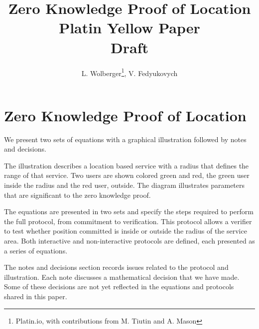 \documentclass{article}
\begin{document}
\pagecolor{yellow}


\title{
	Zero Knowledge Proof of Location\\
	\small{
	Platin Yellow Paper\\
	Draft}
}
\author{L. Wolberger\thanks{Platin.io, with contributions from M. Tiutin and A. Mason}, V. Fedyukovych\footnotemark[1]}
\maketitle

\section{Zero Knowledge Proof of Location}

We present two sets of equations with a graphical illustration followed by notes and decisions. 

The illustration describes a location based service with a radius that defines the range of that service.
Two users are shown colored green and red, the green user inside the radius and the red user, outside.
The diagram illustrates parameters that are significant to the zero knowledge proof. 

The equations are presented in two sets and specify the steps required to perform the full protocol, from commitment to verification.
This protocol allows a verifier to test whether position committed is inside or outside the radius of the service area.
Both interactive  and non-interactive protocols are defined, each presented as a series of equations. 

The notes and decisions section records issues related to the protocol and illustration.
Each note discusses a mathematical decision that we have made.
Some of these decisions are not yet reflected in the equations and protocols shared in this paper. 
\end{document}
